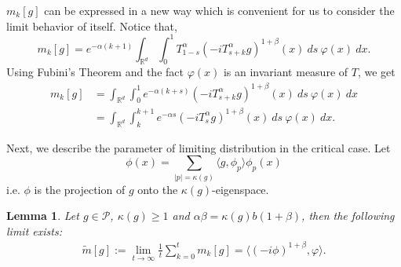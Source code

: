 \documentclass[12pt, a4paper]{amsart}
\newtheorem{lem}[thm]{Lemma}
\theoremstyle{definition}
\numberwithin{equation}{section}
\begin{document}
$m_k[g]$ can be expressed in a new way which is convenient for us to consider the limit behavior of itself. Notice that, 
$$m_k[g]=e^{-\alpha(k+1)}\int_{\mathbb{R}^d}\int_0^1 T_{1-s}^{\alpha}(-iT_{s+k}^{\alpha}g)^{1+\beta}(x)~ds~\varphi(x)~dx.$$
Using Fubini's Theorem and the fact $\varphi(x)$ is an invariant measure of $T$, we get  
\begin{align}
    m_k[g]&=\int_{\mathbb{R}^d}\int_0^1 e^{-\alpha(k+s)}(-iT_{s+k}^{\alpha}g)^{1+\beta}(x)~ds~\varphi(x)~dx\nonumber\\
    &=\int_{\mathbb{R}^d}\int_k^{k+1} e^{-\alpha s}(-iT_{s}^{\alpha}g)^{1+\beta}(x)~ds~\varphi(x)~dx.\label{mkeq}
\end{align}

Next, we describe the parameter of limiting distribution in the critical case. Let 
$$\phi(x)=\sum_{|p|=\kappa(g)}\langle g, \phi_p\rangle\phi_p(x)$$
i.e. $\phi$ is the projection of $g$ onto the $\kappa(g)$-eigenspace.
\begin{lem}\label{lemma210}
Let $g \in \mathcal{P}$, $\kappa(g)\geq 1$ and $\alpha\beta=\kappa(g)b(1+\beta)$, then the following limit exists:
\begin{align}
    \tilde{m}[g]:=\lim_{t\rightarrow \infty}\frac{1}{t}\sum_{k=0}^{t}m_k[g]=\langle(-i\phi)^{1+\beta},\varphi\rangle.
\end{align}
\end{lem}
\end{document}
